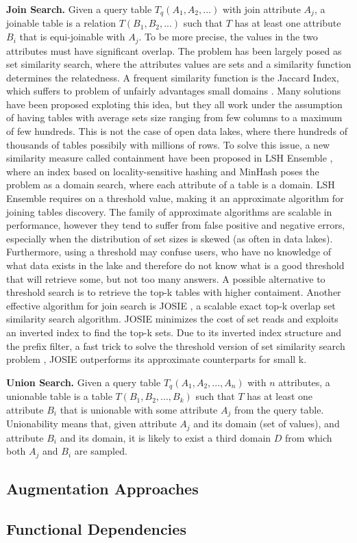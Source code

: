 \textbf{Join Search.} Given a query table $T_q(A_1,A_2,...)$ with join attribute $A_j$, a joinable table is a relation $T(B_1, B_2,...)$ such that $T$ has at least one attribute $B_i$ that is equi-joinable with $A_j$. To be more precise, the values in the two attributes must have significant overlap. The problem has been largely posed as set similarity search, where the attributes values are sets and a similarity function determines the relatedness. A frequent similarity function is the Jaccard Index, which suffers to problem of unfairly advantages small domains \cite{zhu2016lsh}. Many solutions have been proposed exploting this idea, but they all work under the assumption of having tables with average sets size ranging from few columns to a maximum of few hundreds. This is not the case of open data lakes, where there hundreds of thousands of tables possibily with millions of rows. To solve this issue, a new similarity measure called containment have been proposed in LSH Ensemble \cite{zhu2016lsh}, where an index based on locality-sensitive hashing \cite{gionis1999similarity} and MinHash \cite{indyk1998approximate} poses the problem as a domain search, where each attribute of a table is a domain. LSH Ensemble requires on a threshold value, making it an approximate algorithm for joining tables discovery. The family of approximate algorithms are scalable in performance, however they tend to suffer from false positive and negative errors, especially when the distribution of set sizes is skewed (as often in data lakes). Furthermore, using a threshold may confuse users, who have no knowledge of what data exists in the lake and therefore do not know what is a good threshold that will retrieve some, but not too many answers. A possible alternative to threshold search is to retrieve the top-k tables with higher contaiment. Another effective algorithm for join search is JOSIE \cite{zhu2019josie}, a scalable exact top-k overlap set similarity search algorithm. JOSIE minimizes the cost of set reads and exploits an inverted index to find the top-k sets. Due to its inverted index structure and the prefix filter, a fast trick to solve the threshold version of set similarity search problem \cite{chaudhuri2006primitive}, JOSIE outperforms its approximate counterparts for small k.
\bigbreak

\textbf{Union Search.} Given a query table $T_q(A_1,A_2,...,A_n)$ with $n$ attributes, a unionable table is a table $T(B_1, B_2,...,B_k)$ such that $T$ has at least one attribute $B_i$ that is unionable with some attribute $A_j$ from the query table. Unionability means that, given attribute $A_j$ and its domain (set of values), and attribute $B_i$ and its domain, it is likely to exist a third domain $D$ from which both $A_j$ and $B_i$ are sampled.



\subsection{Augmentation Approaches}

\subsection{Functional Dependencies}
